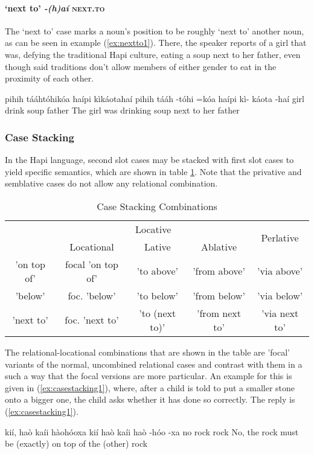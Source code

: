 \documentclass[a4paper, 12pt, oneside]{memoir}
\newcommand{\emh}[1]{\textit{#1}}
\begin{document}
\paragraph{`next to' \emh{-(h)aí} \textsc{next.to}}
The `next to' case marks a noun's position to be roughly `next to' another noun, as can be seen in example (\ref{ex:nextto1}). There, the speaker reports of a girl that was, defying the traditional Hapi culture, eating a soup next to her father, even though said traditions don't allow members of either gender to eat in the proximity of each other.
\begin{examples}
\ex \label{ex:nextto1}
\words pihih tááhtóhikóa haípi kìkáotahaí
\bits pihih tááh -tóhi =kóa haípi kì- káota -haí
\gloss girl drink {\Dpasto} {\Decl} soup {\Tsposs} father {\Next}
\tr The girl was drinking soup next to her father
\end{examples}
\subsubsection{Case
Stacking}\label{scasestacking}
In the Hapi language, second slot cases may be stacked with first slot cases to yield specific semantics, which are shown in table \ref{t:casestacking}. Note that the privative and semblative cases do not allow any relational combination.
\begin{table}[H]
\begin{tabular}{@{}ccccc@{}}
\toprule
\multirow{2}{*}{} & \multicolumn{3}{c}{Locative}                        & \multirow{2}{*}{Perlative} \\ \cmidrule(lr){2-4}
                  & Locational        & Lative         & Ablative       &                            \\ \midrule
'on top of'       & focal 'on top of' & 'to above'     & 'from above'   & 'via above'                \\
'below'           & foc. 'below'      & 'to below'     & 'from below'   & 'via below'                \\
'next to'         & foc. 'next to'    & 'to (next to)' & 'from next to' & 'via next to'              \\ \bottomrule
\end{tabular}
\caption{Case Stacking Combinations}
\label{t:casestacking}
\end{table}
The relational-locational combinations that are shown in the table are 'focal' variants of the normal, uncombined relational cases and contrast with them in a such a way that the focal versions are more particular. An example for this is given in (\ref{ex:casestacking1}), where, after a child is told to put a smaller stone onto a bigger one, the child asks whether it has done so correctly. The reply is (\ref{ex:casestacking1}).
\begin{examples}
\ex \label{ex:casestacking1}
\words kií, haò kaíi hàohóoxa
\bits kií haò kaíi haò -hóo -xa
\gloss no rock {\Cop} rock {\Loc} {\Ont}
\tr No, the rock must be (exactly) on top of the (other) rock
\end{examples}
\end{document}
